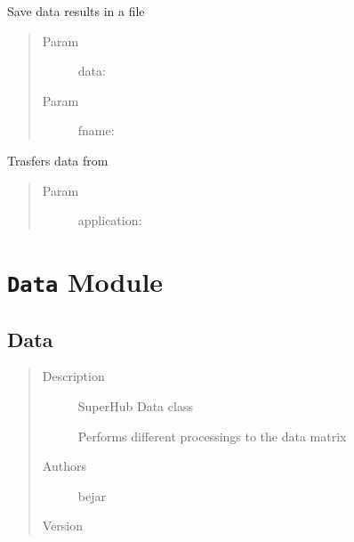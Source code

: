 \documentclass[letterpaper,10pt,english]{sphinxmanual}
\begin{document}

\begin{fulllineitems}
\label{index:SuperHub.DB.saveDataResult}
Save data results in a file
\begin{quote}\begin{description}
\item[{Param }] \leavevmode
data:

\item[{Param }] \leavevmode
fname:

\end{description}\end{quote}

\end{fulllineitems}


\begin{fulllineitems}
\label{index:SuperHub.DB.transferApplicationData}
Trasfers data from
\begin{quote}\begin{description}
\item[{Param }] \leavevmode
application:

\end{description}\end{quote}

\end{fulllineitems}



\chapter{\texttt{Data} Module}
\label{index:data-module}\label{index:module-SuperHub.Data}\label{index:module-Data}

\section{Data}
\label{index:data}\begin{quote}\begin{description}
\item[{Description}] \leavevmode
SuperHub Data class

Performs different processings to the data matrix

\item[{Authors}] \leavevmode
bejar

\item[{Version}] 

\end{description}\end{quote}
\end{document}
